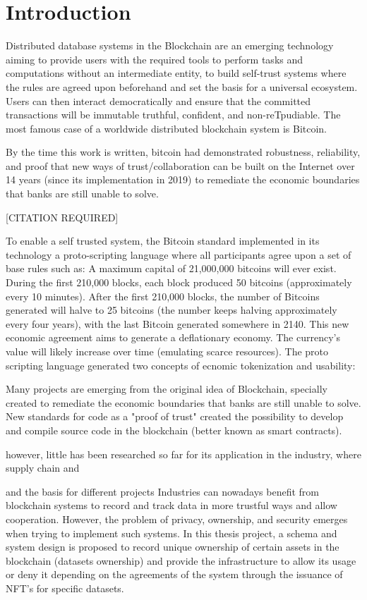 
\chapter{Introduction}
\label{ch:intro}
Distributed database systems in the Blockchain are an emerging technology aiming to provide users with the required tools to perform tasks and computations without an intermediate entity, to build self-trust systems where the rules are agreed upon beforehand and set the basis for a universal ecosystem. Users can then interact democratically and ensure that the committed transactions will be immutable truthful, confident, and non-reTpudiable.
The most famous case of a worldwide distributed blockchain system is Bitcoin. 

By the time this work is written, bitcoin had demonstrated robustness, reliability, and proof that new ways of trust/collaboration can be built on the Internet over 14 years (since its implementation in 2019) to remediate the economic boundaries that banks are still unable to solve.

[CITATION REQUIRED] 


To enable a self trusted system, the Bitcoin standard implemented in its technology a proto-scripting language where all participants agree upon a set of base rules such as:
A maximum capital of 21,000,000 bitcoins will ever exist.
During the first 210,000 blocks, each block produced 50 bitcoins (approximately every 10 minutes).
After the first 210,000 blocks, the number of Bitcoins generated will halve to 25 bitcoins (the number keeps halving approximately every four years), with the last Bitcoin generated somewhere in 2140.
This new economic agreement aims to generate a deflationary economy. The currency's value will likely increase over time (emulating scarce resources). 
The proto scripting language generated two concepts of ecnomic tokenization and usability:

Many projects are emerging from the original idea of Blockchain, specially created to remediate the economic boundaries that banks are still unable to solve. New standards for code as a "proof of trust" created the possibility to develop and compile source code in the blockchain (better known as smart contracts). 

 however, little has been researched so far for its application in the industry, where supply chain and 

  and the basis for different projects 
Industries can nowadays benefit from blockchain systems to record and track data in more trustful ways and allow cooperation. However, the problem of privacy, ownership, and security emerges when trying to implement such systems. In this thesis project, a schema and system design is proposed to record unique ownership of certain assets in the blockchain (datasets ownership) and provide the infrastructure to allow its usage or deny it depending on the agreements of the system through the issuance of NFT's for specific datasets.



